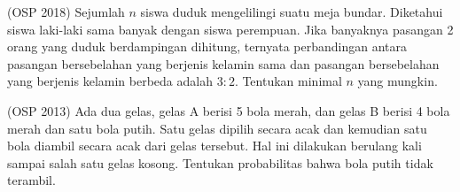 \documentclass[11pt]{scrartcl}
\begin{document}
	\begin{soalbaru}
	(OSP 2018) Sejumlah $n$ siswa duduk mengelilingi suatu meja bundar. Diketahui siswa laki-laki sama banyak dengan siswa perempuan. Jika banyaknya pasangan 2 orang yang duduk berdampingan
	dihitung, ternyata perbandingan antara pasangan bersebelahan yang berjenis kelamin sama dan
	pasangan bersebelahan yang berjenis kelamin berbeda adalah $3 : 2$. Tentukan minimal $n$ yang
	mungkin.
	\end{soalbaru}
	
	\begin{soalbaru}
	(OSP 2013) Ada dua gelas, gelas A berisi 5 bola merah, dan gelas B berisi 4 bola merah dan satu
	bola putih. Satu gelas dipilih secara acak dan kemudian satu bola diambil secara acak dari gelas
	tersebut. Hal ini dilakukan berulang kali sampai salah satu gelas kosong. Tentukan probabilitas
	bahwa bola putih tidak terambil.
	\end{soalbaru} 
\end{document}
